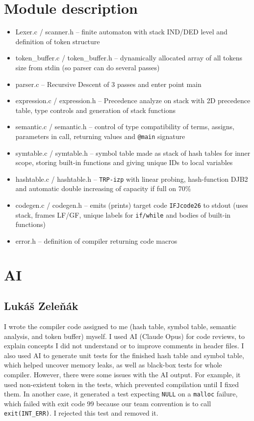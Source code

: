 \documentclass[12pt,a4paper]{article}
\begin{document}
\section{Module description}
\begin{itemize}
\item Lexer.c / scanner.h -- finite automaton with stack IND/DED level and definition of token structure
\item token\_buffer.c / token\_buffer.h -- dynamically allocated array of all tokens size from stdin (so parser can do several passes)
\item parser.c -- Recursive Descent of 3 passes and enter point main
\item expression.c / expression.h -- Precedence analyze on stack with 2D precedence table, type controls and generation of stack functions
\item semantic.c / semantic.h -- control of type compatibility of terms, assigns, parameters in call, returning values and \texttt{@main} signature
\item symtable.c / symtable.h -- symbol table made as stack of hash tables for inner scope, storing built-in functions and giving unique IDs to local variables
\item hashtable.c / hashtable.h -- \texttt{TRP-izp} with linear probing, hash-function DJB2 and automatic double increasing of capacity if full on 70\%
\item codegen.c / codegen.h -- emits (prints) target code \texttt{IFJcode26} to stdout (uses stack, frames LF/GF, unique labels for \texttt{if/while} and bodies of built-in functions)
\item error.h -- definition of compiler returning code macros
\end{itemize}

\section{AI}
\subsection{Lukáš Zeleňák}

I wrote the compiler code assigned to me (hash table, symbol table, semantic analysis, and token buffer) myself. I used AI (Claude Opus) for code reviews, to explain concepts I did not understand or to improve comments in header files. I also used AI to generate unit tests for the finished hash table and symbol table, which helped uncover memory leaks, as well as black-box tests for whole compiler. However, there were some issues with the AI output. For example, it used non-existent token in the tests, which prevented compilation until I fixed them. In another case, it generated a test expecting \texttt{NULL} on a \texttt{malloc} failure, which failed with exit code 99 because our team convention is to call \texttt{exit(INT\_ERR)}. I rejected this test and removed it.
\end{document}
